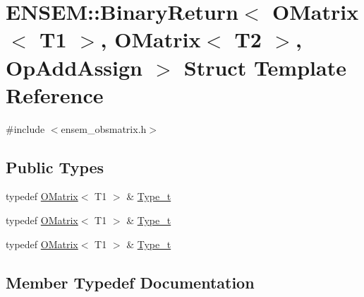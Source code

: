 \hypertarget{structENSEM_1_1BinaryReturn_3_01OMatrix_3_01T1_01_4_00_01OMatrix_3_01T2_01_4_00_01OpAddAssign_01_4}{}\section{E\+N\+S\+EM\+:\+:Binary\+Return$<$ O\+Matrix$<$ T1 $>$, O\+Matrix$<$ T2 $>$, Op\+Add\+Assign $>$ Struct Template Reference}
\label{structENSEM_1_1BinaryReturn_3_01OMatrix_3_01T1_01_4_00_01OMatrix_3_01T2_01_4_00_01OpAddAssign_01_4}


{\ttfamily \#include $<$ensem\+\_\+obsmatrix.\+h$>$}

\subsection*{Public Types}
\begin{DoxyCompactItemize}
\item 
typedef \mbox{\hyperlink{classENSEM_1_1OMatrix}{O\+Matrix}}$<$ T1 $>$ \& \mbox{\hyperlink{structENSEM_1_1BinaryReturn_3_01OMatrix_3_01T1_01_4_00_01OMatrix_3_01T2_01_4_00_01OpAddAssign_01_4_ac7f4c7cfa59cf0bc46d8cf9fb7c5189f}{Type\+\_\+t}}
\item 
typedef \mbox{\hyperlink{classENSEM_1_1OMatrix}{O\+Matrix}}$<$ T1 $>$ \& \mbox{\hyperlink{structENSEM_1_1BinaryReturn_3_01OMatrix_3_01T1_01_4_00_01OMatrix_3_01T2_01_4_00_01OpAddAssign_01_4_ac7f4c7cfa59cf0bc46d8cf9fb7c5189f}{Type\+\_\+t}}
\item 
typedef \mbox{\hyperlink{classENSEM_1_1OMatrix}{O\+Matrix}}$<$ T1 $>$ \& \mbox{\hyperlink{structENSEM_1_1BinaryReturn_3_01OMatrix_3_01T1_01_4_00_01OMatrix_3_01T2_01_4_00_01OpAddAssign_01_4_ac7f4c7cfa59cf0bc46d8cf9fb7c5189f}{Type\+\_\+t}}
\end{DoxyCompactItemize}


\subsection{Member Typedef Documentation}
\mbox{\label{structENSEM_1_1BinaryReturn_3_01OMatrix_3_01T1_01_4_00_01OMatrix_3_01T2_01_4_00_01OpAddAssign_01_4_ac7f4c7cfa59cf0bc46d8cf9fb7c5189f}} 
